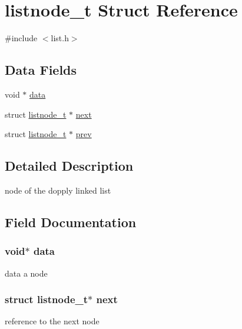 \hypertarget{structlistnode__t}{}\section{listnode\+\_\+t Struct Reference}
\label{structlistnode__t}


{\ttfamily \#include $<$list.\+h$>$}

\subsection*{Data Fields}
\begin{DoxyCompactItemize}
\item 
void $\ast$ \hyperlink{structlistnode__t_a735984d41155bc1032e09bece8f8d66d}{data}
\item 
struct \hyperlink{structlistnode__t}{listnode\+\_\+t} $\ast$ \hyperlink{structlistnode__t_a491ae13687d55ddd54cc5ae4667fe4e0}{next}
\item 
struct \hyperlink{structlistnode__t}{listnode\+\_\+t} $\ast$ \hyperlink{structlistnode__t_a4b114c5c941f37023b31fea9af3f48ea}{prev}
\end{DoxyCompactItemize}


\subsection{Detailed Description}
node of the dopply linked list 

\subsection{Field Documentation}
\subsubsection[{\texorpdfstring{data}{data}}]{\setlength{\rightskip}{0pt plus 5cm}void$\ast$ data}\hypertarget{structlistnode__t_a735984d41155bc1032e09bece8f8d66d}{}\label{structlistnode__t_a735984d41155bc1032e09bece8f8d66d}
data a node 
\subsubsection[{\texorpdfstring{next}{next}}]{\setlength{\rightskip}{0pt plus 5cm}struct {\bf listnode\+\_\+t}$\ast$ next}\hypertarget{structlistnode__t_a491ae13687d55ddd54cc5ae4667fe4e0}{}\label{structlistnode__t_a491ae13687d55ddd54cc5ae4667fe4e0}
reference to the next node 
